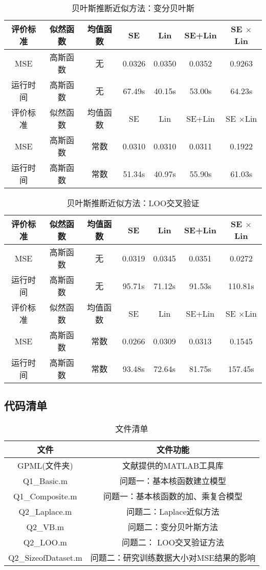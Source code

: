 \documentclass[10pt,twocolumn]{article}
\begin{document}
\begin{table}[!htbp]
\centering
\begin{tabular}{c|c|c|c|c|c|c}
\hline\hline
评价标准&似然函数&均值函数&SE&Lin&SE+Lin&SE $\times$Lin\\ \hline
MSE&高斯函数&无&0.0326 & 0.0350 & 0.0352 & 0.9263\\
运行时间&高斯函数&无& 67.49s & 40.15s & 53.00s & 64.23s \\\hline
评价标准&似然函数&均值函数&SE&Lin&SE+Lin&SE $\times$Lin\\ \hline
MSE&高斯函数&常数& 0.0310 & 0.0310 & 0.0311 & 0.1922\\
运行时间&高斯函数&常数& 51.34s & 40.97s &  55.90s & 61.03s\\
\hline\hline
\end{tabular}
\caption{贝叶斯推断近似方法：变分贝叶斯}
\label{VB}
\end{table}

\begin{table}[!htbp]
\centering
\begin{tabular}{c|c|c|c|c|c|c}
\hline\hline
评价标准&似然函数&均值函数&SE&Lin&SE+Lin&SE $\times$Lin\\ \hline
MSE&高斯函数&无& 0.0319 & 0.0345 & 0.0351 & 0.0272 \\
运行时间&高斯函数&无& 95.71s & 71.12s & 91.53s & 110.81s \\\hline
评价标准&似然函数&均值函数&SE&Lin&SE+Lin&SE $\times$Lin\\ \hline
MSE&高斯函数&常数&  0.0266& 0.0309 & 0.0313 & 0.1545\\
运行时间&高斯函数&常数& 93.48s & 72.64s & 81.75s & 157.45s\\
\hline\hline
\end{tabular}
\caption{贝叶斯推断近似方法：LOO交叉验证}
\label{LOO}
\end{table}

\newpage
\subsection{代码清单}

\begin{table}[!htbp]
\centering
\begin{tabular}{c|c}
\hline\hline
文件 & 文件功能 \\ \hline 
GPML(文件夹) & 文献\cite{GPML}提供的MATLAB工具库 \\ \hline
Q1\_Basic.m & 问题一：基本核函数建立模型 \\
Q1\_Composite.m & 问题一：基本核函数的加、乘复合模型 \\ \hline
Q2\_Laplace.m & 问题二：Laplace近似方法 \\
Q2\_VB.m & 问题二：变分贝叶斯方法 \\
Q2\_LOO.m & 问题二： LOO交叉验证方法 \\ 
Q2\_SizeofDataset.m & 问题二：研究训练数据大小对MSE结果的影响 \\
\hline\hline
\end{tabular}
\caption{文件清单}
\label{list1}
\end{table}
\end{document}

